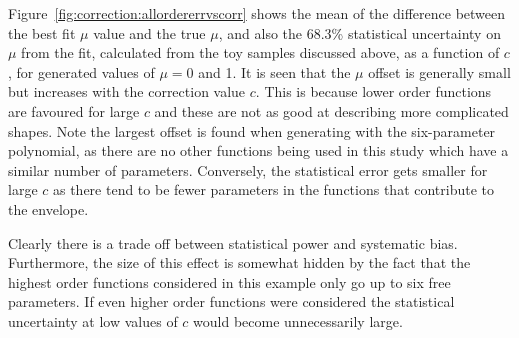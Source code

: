 Figure~\ref{fig:correction:allordererrvscorr} shows the mean of the difference
between the best fit $\mu$ value and the true $\mu$, and also the 68.3\%
statistical uncertainty on $\mu$ from the fit, calculated from the toy
samples discussed above, as a function of $c$,
for generated values of $\mu=0$ and 1. It is seen that the $\mu$ offset
is generally small but increases with the correction value $c$. This is
because lower order functions are favoured for large $c$ and these are not as good at
describing more complicated shapes. Note the largest
offset is found when generating with the six-parameter polynomial, as there
are no other functions being used in this study which have a similar number
of parameters.
Conversely, the
statistical error gets smaller for large $c$ as there tend to be fewer parameters
in the functions that contribute to the envelope.

Clearly there is a trade off between statistical power and systematic bias. Furthermore, the
size of this effect is somewhat hidden by the fact that the highest order functions considered
in this example only go up to six free parameters. If even higher order functions were considered
the statistical uncertainty at low values of $c$ would become unnecessarily large.

